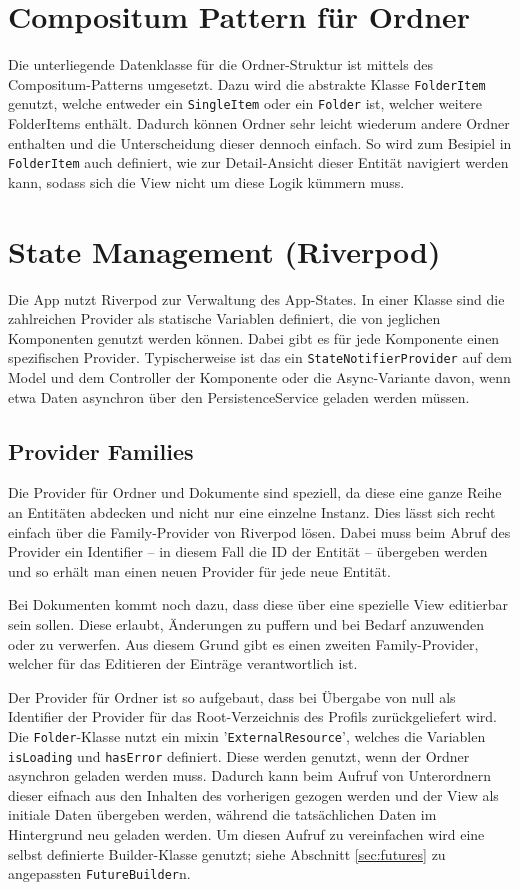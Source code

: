 \section{Compositum Pattern für Ordner}

Die unterliegende Datenklasse für die Ordner-Struktur ist mittels des Compositum-Patterns umgesetzt.
Dazu wird die abstrakte Klasse \verb|FolderItem| genutzt, welche entweder ein \verb|SingleItem| oder ein \verb|Folder| ist, welcher weitere FolderItems enthält.
Dadurch können Ordner sehr leicht wiederum andere Ordner enthalten und die Unterscheidung dieser dennoch einfach.
So wird zum Besipiel in \verb|FolderItem| auch definiert, wie zur Detail-Ansicht dieser Entität navigiert werden kann, sodass sich die View nicht um diese Logik kümmern muss.

\section{State Management (Riverpod)}

Die App nutzt Riverpod zur Verwaltung des App-States. In einer Klasse sind die zahlreichen Provider als statische Variablen definiert, die von jeglichen Komponenten genutzt werden können.
Dabei gibt es für jede Komponente einen spezifischen Provider. Typischerweise ist das ein \verb|StateNotifierProvider| auf dem Model und dem Controller der Komponente oder die Async-Variante davon, wenn etwa Daten asynchron über den PersistenceService geladen werden müssen.

\subsection{Provider Families}

Die Provider für Ordner und Dokumente sind speziell, da diese eine ganze Reihe an Entitäten abdecken und nicht nur eine einzelne Instanz.
Dies lässt sich recht einfach über die Family-Provider von Riverpod lösen. Dabei muss beim Abruf des Provider ein Identifier \--- in diesem Fall die ID der Entität \--- übergeben werden und so erhält man einen neuen Provider für jede neue Entität.

Bei Dokumenten kommt noch dazu, dass diese über eine spezielle View editierbar sein sollen. Diese erlaubt, Änderungen zu puffern und bei Bedarf anzuwenden oder zu verwerfen.
Aus diesem Grund gibt es einen zweiten Family-Provider, welcher für das Editieren der Einträge verantwortlich ist.

Der Provider für Ordner ist so aufgebaut, dass bei Übergabe von null als Identifier der Provider für das Root-Verzeichnis des Profils zurückgeliefert wird.
Die \verb|Folder|-Klasse nutzt ein mixin '\verb|ExternalResource|', welches die Variablen \verb|isLoading| und \verb|hasError| definiert. Diese werden genutzt, wenn der Ordner asynchron geladen werden muss. Dadurch kann beim Aufruf von Unterordnern dieser eifnach aus den Inhalten des vorherigen gezogen werden und der View als initiale Daten übergeben werden, während die tatsächlichen Daten im Hintergrund neu geladen werden. Um diesen Aufruf zu vereinfachen wird eine selbst definierte Builder-Klasse genutzt; siehe Abschnitt \ref{sec:futures} zu angepassten \verb|FutureBuilder|n.

